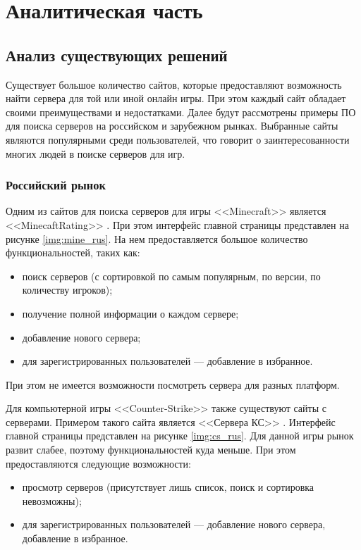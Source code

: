 \chapter{Аналитическая часть}

\section{Анализ существующих решений}

Существует большое количество сайтов, которые предоставляют возможность найти сервера для той или иной онлайн игры. При этом каждый сайт обладает своими преимуществами и недостатками. Далее будут рассмотрены примеры ПО для поиска серверов на российском и зарубежном рынках. Выбранные сайты являются популярными среди пользователей, что говорит о заинтересованности многих людей в поиске серверов для игр.

\subsection{Российский рынок}

Одним из сайтов для поиска серверов для игры <<Minecraft>> \cite{minecraft} является \newline <<MinecaftRating>> \cite{mine-rating}. При этом интерфейс главной страницы представлен на рисунке \ref{img:mine_rus}. На нем предоставляется большое количество функциональностей, таких как:

\begin{itemize}
    \item поиск серверов (с сортировкой по самым популярным, по версии, по количеству игроков);
    \item получение полной информации о каждом сервере;
    \item добавление нового сервера;
    \item для зарегистрированных пользователей --- добавление в избранное.
\end{itemize}

При этом не имеется возможности посмотреть сервера для разных платформ.

Для компьютерной игры <<Counter-Strike>> \cite{cs} также существуют сайты с серверами. 
Примером такого сайта является <<Сервера КС>> \cite{servers-cs}. Интерфейс главной страницы представлен на рисунке \ref{img:cs_rus}. Для данной игры рынок развит слабее, поэтому функциональностей куда меньше. При этом предоставляются следующие возможности:

\begin{itemize}
    \item просмотр серверов (присутствует лишь список, поиск и сортировка невозможны); 
    \item для зарегистрированных пользователей --- добавление нового сервера, добавление в избранное.
\end{itemize}

